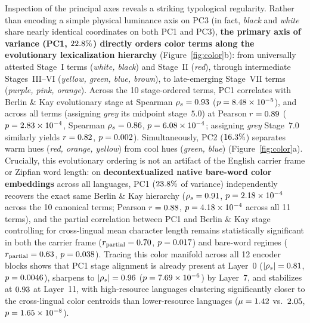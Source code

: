 Inspection of the principal axes reveals a striking typological regularity.
Rather than encoding a simple physical luminance axis on PC3 (in fact, \emph{black} and \emph{white} share nearly identical coordinates on both PC1 and PC3), \textbf{the primary axis of variance (PC1, $22.8{}\%$) directly orders color terms along the \citet{berlin1969} evolutionary lexicalization hierarchy} (Figure~\ref{fig:color}b): from universally attested Stage~I terms (\emph{white, black}) and Stage~II (\emph{red}), through intermediate Stages~III--VI (\emph{yellow, green, blue, brown}), to late-emerging Stage~VII terms (\emph{purple, pink, orange}).
Across the 10 stage-ordered terms, PC1 correlates with Berlin \& Kay evolutionary stage at Spearman $\rho_s = 0.93{}$ ($p = 8.48 \times 10^{-5}{}$), and across all \ColorNumColors{} terms (assigning \emph{grey} its midpoint stage~$5.0$) at Pearson $r = 0.89{}$ ($p = 2.83 \times 10^{-4}{}$, Spearman $\rho_s = 0.86{}$, $p = 6.08 \times 10^{-4}{}$; assigning \emph{grey} Stage~$7.0$ similarly yields $r = 0.82{}$, $p = 0.002{}$).
Simultaneously, PC2 ($16.3{}\%$) separates warm hues (\emph{red, orange, yellow}) from cool hues (\emph{green, blue}) (Figure~\ref{fig:color}a).
Crucially, this evolutionary ordering is not an artifact of the English carrier frame or Zipfian word length: on \textbf{decontextualized native bare-word color embeddings} across all \ColorNumLanguages{} languages, PC1 ($23.8{}\%$ of variance) independently recovers the exact same Berlin \& Kay hierarchy ($\rho_s = 0.91{}$, $p = 2.18 \times 10^{-4}{}$ across the 10 canonical terms; Pearson $r = 0.88{}$, $p = 4.18 \times 10^{-4}{}$ across all 11 terms), and the partial correlation between PC1 and Berlin \& Kay stage controlling for cross-lingual mean character length remains statistically significant in both the carrier frame ($r_{\text{partial}} = 0.70{}$, $p = 0.017{}$) and bare-word regimes ($r_{\text{partial}} = 0.63{}$, $p = 0.038{}$).
Tracing this color manifold across all 12 encoder blocks shows that PC1 stage alignment is already present at Layer~0 ($|\rho_s| = 0.81{}$, $p = 0.0046{}$), sharpens to $|\rho_s| = 0.96{}$ ($p = 7.69 \times 10^{-6}{}$) by Layer~7, and stabilizes at $0.93{}$ at Layer~11, with high-resource languages clustering significantly closer to the cross-lingual color centroids than lower-resource languages ($\mu = 1.42{}$ vs.\ $2.05{}$, $p = 1.65 \times 10^{-8}{}$).

